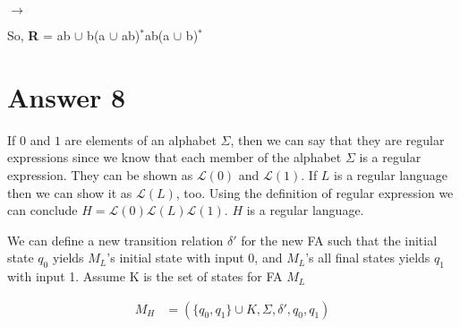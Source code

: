 \documentclass[12pt]{article}
\begin{document}
$\rightarrow$
\begin{minipage}{0.5\textwidth}
  \vspace{0.5 cm}
\end{minipage}
\begin{center}
  \vspace{0.3 cm}
  So, \textbf{R} = ab $\cup$ b(a $\cup$ ab)$^*$ab(a $\cup$ b)$^*$
\end{center}


\section*{Answer 8}
\qquad If $0$ and $1$ are elements of an alphabet $\Sigma$, then we can say that they are regular expressions since we know that each member of the alphabet $\Sigma$ is a regular expression. They can be shown as $\mathcal{L}(0)$ and $\mathcal{L}(1)$. If $L$ is a regular language then we can show it as $\mathcal{L}(L)$, too. Using the definition of regular expression we can conclude $H = \mathcal{L}(0)\mathcal{L}(L)\mathcal{L}(1)$. $H$ is a regular language.

\newpage
\qquad We can define a new transition relation $\delta'$ for the new FA such that the initial state $q_0$ yields $M_L$'s initial state with input 0, and $M_L$'s all final states yields $q_1$ with input 1. Assume K is the set of states for FA $M_L$\\
\begin{minipage}{0.5\textwidth}
  \vspace{0.5 cm}
\end{minipage}\hfill
\begin{minipage}{0.5\textwidth}
  \begin{align*}
    M_H   & = (\{q_0, q_1\} \cup K, \Sigma, \delta', q_0, q_1)
  \end{align*}
\end{minipage}\hfill
\vspace{0.5 cm}
\end{document}
